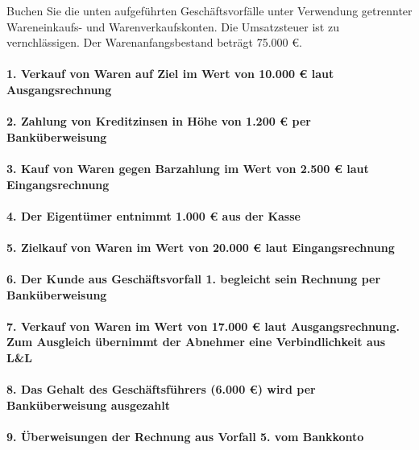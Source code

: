 \documentclass[paper=a4, fontsize=11pt]{scrartcl}
\numberwithin{equation}{section}
\numberwithin{figure}{section}
\numberwithin{table}{section}
\begin{document}
Buchen Sie die unten aufgeführten Geschäftsvorfälle unter Verwendung getrennter Wareneinkaufs- und Warenverkaufskonten. Die Umsatzsteuer ist zu vernchlässigen. Der Warenanfangsbestand beträgt 75.000 €.

\paragraph{1. Verkauf von Waren auf Ziel im Wert von 10.000 € laut Ausgangsrechnung}

\paragraph{2. Zahlung von Kreditzinsen in Höhe von 1.200 € per Banküberweisung}

\paragraph{3. Kauf von Waren gegen Barzahlung im Wert von 2.500 € laut Eingangsrechnung}

\paragraph{4. Der Eigentümer entnimmt 1.000 € aus der Kasse}

\paragraph{5. Zielkauf von Waren im Wert von 20.000 € laut Eingangsrechnung}

\paragraph{6. Der Kunde aus Geschäftsvorfall 1. begleicht sein Rechnung per Banküberweisung}

\paragraph{7. Verkauf von Waren im Wert von 17.000 € laut Ausgangsrechnung. Zum Ausgleich übernimmt der Abnehmer eine Verbindlichkeit aus L&L}

\paragraph{8. Das Gehalt des Geschäftsführers (6.000 €) wird per Banküberweisung ausgezahlt}

\paragraph{9. Überweisungen der Rechnung aus Vorfall 5. vom Bankkonto}
\end{document}
